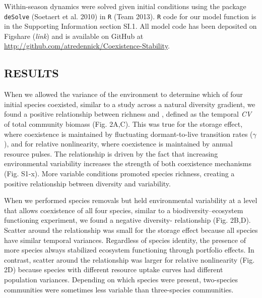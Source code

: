 \documentclass[12pt,]{article}
\begin{document}
Within-season dynamics were solved given initial conditions using the
package \texttt{deSolve} (Soetaert et al. 2010) in \texttt{R} (Team
2013). \texttt{R} code for our model function is in the Supporting
Information section SI.1. All model code has been deposited on Figshare
(\emph{link}) and is available on GitHub at
\url{http://github.com/atredennick/Coexistence-Stability}.

\subsection{RESULTS}\label{results}

When we allowed the variance of the environment to determine which of
four initial species coexisted, similar to a study across a natural
diversity gradient, we found a positive relationship between richness
and , defined as the temporal \emph{CV} of
total community biomass (Fig. 2A,C). This was true for the storage
effect, where coexistence is maintained by fluctuating dormant-to-live
transition rates (\(\gamma\)), and for relative nonlinearity, where
coexistence is maintained by annual resource pulses. The relationship is
driven by the fact that increasing environmental variability increases
the strength of both coexistence mechanisms (Fig. S1-x). More variable
conditions promoted species richness, creating a positive relationship
between diversity and  variability.

When we performed species removals but held environmental variability at
a level that allows coexistence of all four species, similar to a
biodiversity--ecosystem functioning experiment, we found a negative
diversity- relationship (Fig. 2B,D). Scatter
around the relationship was small for the storage effect because all
species have similar temporal variances. Regardless of species identity,
the presence of more species always stabilized ecosystem functioning
through portfolio effects. In contrast, scatter around the relationship
was larger for relative nonlinearity (Fig. 2D) because species with
different resource uptake curves had different population variances.
Depending on which species were present, two-species communities were
sometimes less variable than three-species communities.
\end{document}
